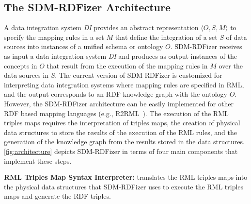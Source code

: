 \subsection{The SDM-RDFizer Architecture}
A data integration system \textit{DI} provides an abstract representation $\langle O,S,M\rangle$ to specify the mapping rules in a set $M$ that define the integration of a set $S$ of data sources into instances of a unified schema or ontology $O$. 
SDM-RDFizer receives as input a data integration system \textit{DI} and produces as output instances of the concepts in $O$ that result from the execution of the mapping rules in $M$ over the data sources in $S$. 
The current version of SDM-RDFizer is customized for interpreting data integration systems where mapping rules are specified in RML, and the output corresponds to an RDF knowledge graph with the ontology $O$. 
However, the SDM-RDFizer architecture can be easily implemented for other RDF based mapping languages (e.g., R2RML~\citep{das2012r2rml}).  
The execution of the RML triples maps requires the interpretation of triples maps, the creation of physical data structures to store the results of the execution of the RML rules, and the generation of the knowledge graph from the results stored in the data structures. \autoref{fig:architecture} depicts SDM-RDFizer in terms of four main components that implement these steps. 

\noindent\textbf{RML Triples Map Syntax Interpreter:} translates the RML triples maps into the physical data structures that SDM-RDFizer uses to execute the RML triples maps and generate the RDF triples.

